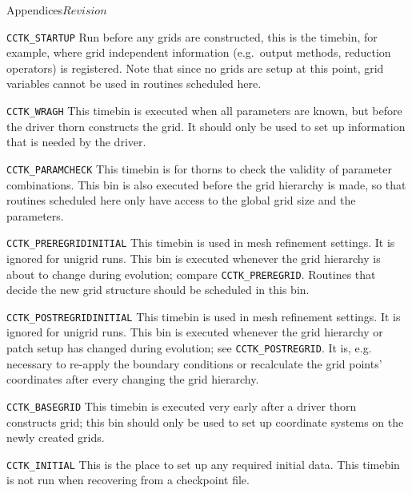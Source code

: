 \begin{cactuspart}{Appendices}{}{$Revision$}
\begin{Lentry}
\item[{\tt CCTK\_STARTUP}] 
        Run before any grids are constructed, this is 
        the timebin, for example, where grid independent information 
        (e.g.\ output methods, reduction operators) is registered. 
        Note that since no grids are setup at this point, grid 
        variables cannot be used in routines scheduled here.

\item[{\tt CCTK\_WRAGH}]
        This timebin is executed when all parameters are known, but
        before the driver thorn constructs the grid.  It should only
        be used to set up information that is needed by the driver.

\item[{\tt CCTK\_PARAMCHECK}] 
        This timebin is for thorns to check the validity of
        parameter combinations. This bin is also executed before the
        grid hierarchy is made, so that routines scheduled here only
        have access to the global grid size and the parameters.

\item[{\tt CCTK\_PREREGRIDINITIAL}]
        This timebin is used in mesh refinement settings.  It is
        ignored for unigrid runs.  This bin is executed whenever the
        grid hierarchy is about to change during evolution; compare
        {\tt CCTK\_PREREGRID}.  Routines that decide the
        new grid structure should be scheduled in this bin.

\item[{\tt CCTK\_POSTREGRIDINITIAL}]
        This timebin is used in mesh refinement settings.  It is
        ignored for unigrid runs.  This bin is executed whenever the
        grid hierarchy or patch setup has changed during evolution;
        see {\tt CCTK\_POSTREGRID}.  It is, e.g.
        necessary to re-apply the boundary conditions or recalculate
        the grid points' coordinates after every changing the grid
        hierarchy.

\item[{\tt CCTK\_BASEGRID}]
        This timebin is executed very early after a driver thorn
        constructs grid; this bin should only be used to set up
        coordinate systems on the newly created grids.

\item[{\tt CCTK\_INITIAL}] 
        This is the place to set up any required initial data. This timebin
        is not run when recovering from a checkpoint file.


\end{Lentry}
\end{cactuspart}
